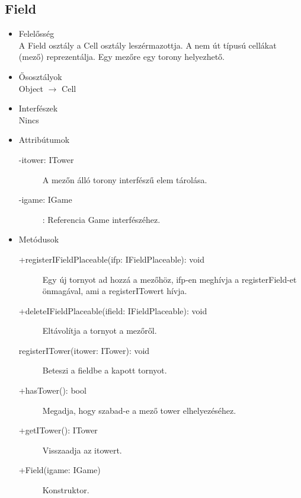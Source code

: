 \subsection{Field}
\begin{itemize}
\item Felelősség\\
A Field osztály a Cell osztály leszérmazottja. A nem út típusú cellákat (mező) reprezentálja. Egy mezőre egy torony helyezhető.
\item Ősosztályok\\
Object $\rightarrow$ Cell
\item Interfészek\\
Nincs
\item Attribútumok
	\begin{description}
		\item[-itower: ITower] A mezőn álló torony interfészű elem tárolása.  
		\item[-igame: IGame]: Referencia Game interfészéhez.

		
	\end{description}
\item Metódusok
	\begin{description}
		
		
		\item[+registerIFieldPlaceable(ifp: IFieldPlaceable): void] Egy új tornyot ad hozzá a mezőhöz, ifp-en meghívja a registerField-et önmagával, ami a registerITowert hívja. 
		\item[+deleteIFieldPlaceable(ifield: IFieldPlaceable): void] Eltávolítja a tornyot a mezőről. 
		\item[registerITower(itower: ITower): void] Beteszi a fieldbe a kapott tornyot. 
		\item[+hasTower(): bool] Megadja, hogy szabad-e a mező tower elhelyezéséhez. 
		\item[+getITower(): ITower] Visszaadja az itowert. 
		\item[+Field(igame: IGame)] Konstruktor. 
		
		
	\end{description}
\end{itemize}




